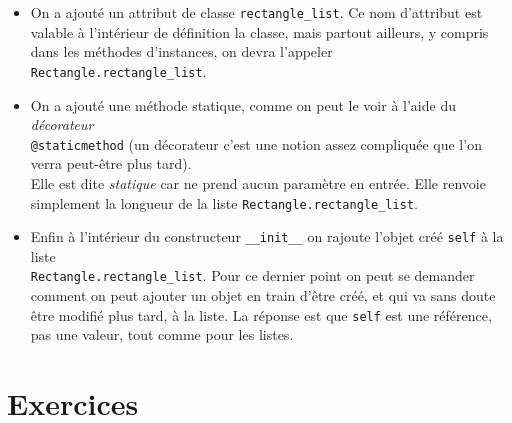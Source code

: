 \documentclass[a4paper,10pt,cours,firamath]{nsi}
\begin{document}
\begin{itemize}
    \item     On a ajouté un attribut de classe \texttt{rectangle_list}. Ce nom d'attribut est valable à l'intérieur de définition la classe, mais partout ailleurs, y compris dans les méthodes d'instances, on devra l'appeler \texttt{Rectangle.rectangle_list}.
    \item     On a ajouté une méthode statique, comme on peut le voir à l'aide du \textit{décorateur}\\ \texttt{@staticmethod} (un décorateur c'est une notion assez compliquée que l'on verra peut-être plus tard).\\
          Elle est dite \textit{statique} car ne prend aucun paramètre en entrée. Elle renvoie simplement la longueur de la liste \texttt{Rectangle.rectangle_list}.
    \item    Enfin à l'intérieur du constructeur \texttt{__init__} on rajoute l'objet créé \texttt{self} à la liste\\ \texttt{Rectangle.rectangle_list}. Pour ce dernier point on peut se demander comment on peut ajouter un objet en train d'être créé, et qui va sans doute être modifié plus tard, à la liste. La réponse est que \texttt{self} est une référence, pas une valeur, tout comme pour les listes.
\end{itemize}
\section{Exercices}
\end{document}
